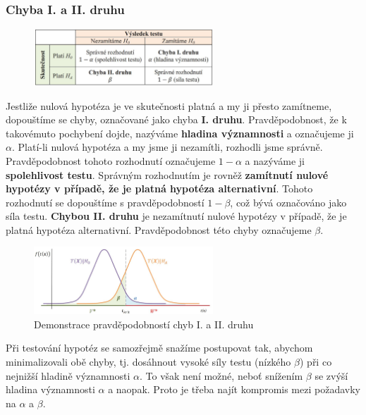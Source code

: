 \subsubsection{Chyba I. a II. druhu}
\begin{figure}[H]
\centering
\includegraphics[width=0.6\textwidth]{assets/14_chyba_tab}
\end{figure}
Jestliže nulová hypotéza je ve skutečnosti platná a my ji přesto zamítneme, dopouštíme se chyby, označované jako chyba \textbf{I. druhu}. Pravděpodobnost, že k takovémuto pochybení dojde, nazýváme \textbf{hladina významnosti} a označujeme ji $\alpha$. Platí-li nulová hypotéza a my jsme ji nezamítli, rozhodli jsme správně. Pravděpodobnost tohoto rozhodnutí označujeme $1 − \alpha$ a nazýváme ji \textbf{spolehlivost testu}. Správným rozhodnutím je rovněž \textbf{zamítnutí nulové hypotézy v případě, že je platná hypotéza alternativní}. Tohoto rozhodnutí se dopouštíme s pravděpodobností $1 − \beta$, což bývá označováno jako síla testu. \textbf{Chybou II. druhu} je nezamítnutí nulové hypotézy v případě, že je platná hypotéza alternativní. Pravděpodobnost této chyby označujeme $\beta$.
\begin{figure}[H]
\centering
\includegraphics[width=0.6\textwidth]{assets/14_chyba_graf}
\caption{Demonstrace pravděpodobností chyb I. a II. druhu}
\end{figure}
Při testování hypotéz se samozřejmě snažíme postupovat tak, abychom minimalizovali obě chyby, tj. dosáhnout vysoké síly testu (nízkého $\beta$) při co nejnižší hladině významnosti $\alpha$. To však není možné, neboť snížením $\beta$ se zvýší hladina významnosti $\alpha$ a naopak. Proto je třeba najít kompromis mezi požadavky na $\alpha$ a $\beta$.


